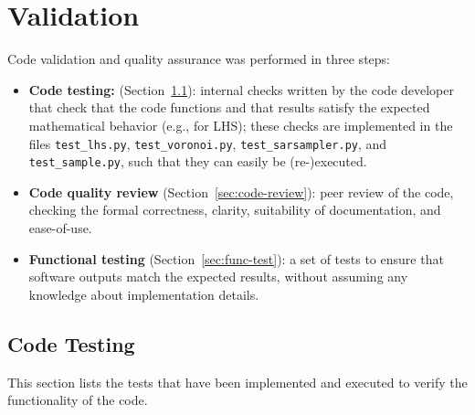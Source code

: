 \documentclass{./class/itisreport}
\begin{document}
\FloatBarrier
\newpage
\section{Validation}\label{sec:val-all}

Code validation and quality assurance was performed in three steps:

\begin{itemize}
\item \textbf{Code testing:} (Section~\ref{sec:code-val}): internal checks written by the code developer that check that the code functions and that results satisfy the expected mathematical behavior (e.g., for LHS); these checks are implemented in the files \verb|test_lhs.py|, \verb|test_voronoi.py|,
\verb|test_sarsampler.py|, and \verb|test_sample.py|, such that they can easily be (re-)executed.
\item \textbf{Code quality review} (Section~\ref{sec:code-review}): peer review of the code, checking the formal correctness, clarity, suitability of documentation, and ease-of-use.
\item \textbf{Functional testing} (Section~\ref{sec:func-test}): a set of tests to ensure that software outputs match the expected results, without assuming any knowledge about implementation details.
\end{itemize}

\subsection{Code Testing}\label{sec:code-val}

This section lists the tests that have been implemented and executed to verify the functionality of the code.
\end{document}
